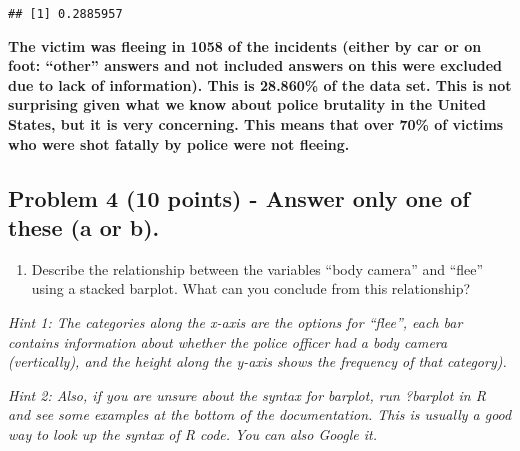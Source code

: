 \documentclass[
]{article}
\newenvironment{Shaded}{\begin{snugshade}}{\end{snugshade}}
\newcommand{\AttributeTok}[1]{\textcolor[rgb]{0.77,0.63,0.00}{#1}}
\newcommand{\ConstantTok}[1]{\textcolor[rgb]{0.00,0.00,0.00}{#1}}
\newcommand{\FunctionTok}[1]{\textcolor[rgb]{0.00,0.00,0.00}{#1}}
\newcommand{\NormalTok}[1]{#1}
\newcommand{\OtherTok}[1]{\textcolor[rgb]{0.56,0.35,0.01}{#1}}
\newcommand{\SpecialCharTok}[1]{\textcolor[rgb]{0.00,0.00,0.00}{#1}}
\newcommand{\StringTok}[1]{\textcolor[rgb]{0.31,0.60,0.02}{#1}}
\providecommand{\tightlist}{%
  \setlength{\itemsep}{0pt}\setlength{\parskip}{0pt}}
\begin{document}
\begin{verbatim}
## [1] 0.2885957
\end{verbatim}

\textbf{The victim was fleeing in 1058 of the incidents (either by car
or on foot: ``other'' answers and not included answers on this were
excluded due to lack of information). This is 28.860\% of the data set.
This is not surprising given what we know about police brutality in the
United States, but it is very concerning. This means that over 70\% of
victims who were shot fatally by police were not fleeing.}

\hypertarget{problem-4-10-points---answer-only-one-of-these-a-or-b.}{%
\subsection{Problem 4 (10 points) - Answer only one of these (a or
b).}\label{problem-4-10-points---answer-only-one-of-these-a-or-b.}}

\begin{enumerate}
\def\labelenumi{\alph{enumi}.}
\tightlist
\item
  Describe the relationship between the variables ``body camera'' and
  ``flee'' using a stacked barplot. What can you conclude from this
  relationship?
\end{enumerate}

\emph{Hint 1: The categories along the x-axis are the options for
``flee'', each bar contains information about whether the police officer
had a body camera (vertically), and the height along the y-axis shows
the frequency of that category).}

\emph{Hint 2: Also, if you are unsure about the syntax for barplot, run
?barplot in R and see some examples at the bottom of the documentation.
This is usually a good way to look up the syntax of R code. You can also
Google it.}

\begin{Shaded}
\end{Shaded}
\end{document}

